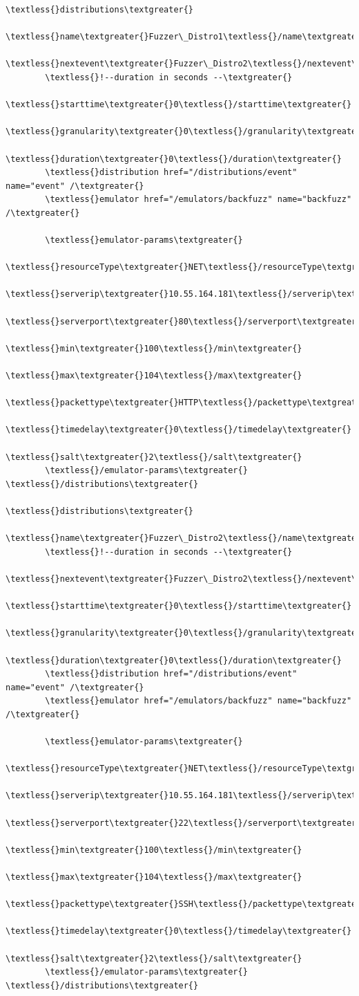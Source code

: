 \documentclass[letterpaper,10pt,english]{sphinxhowto}
\begin{document}
\begin{Verbatim}[commandchars=\\\{\}]
\textless{}distributions\textgreater{}
        \textless{}name\textgreater{}Fuzzer\_Distro1\textless{}/name\textgreater{}
        \textless{}nextevent\textgreater{}Fuzzer\_Distro2\textless{}/nextevent\textgreater{}
        \textless{}!--duration in seconds --\textgreater{}
        \textless{}starttime\textgreater{}0\textless{}/starttime\textgreater{}
        \textless{}granularity\textgreater{}0\textless{}/granularity\textgreater{}
        \textless{}duration\textgreater{}0\textless{}/duration\textgreater{}
        \textless{}distribution href="/distributions/event" name="event" /\textgreater{}
        \textless{}emulator href="/emulators/backfuzz" name="backfuzz" /\textgreater{}

        \textless{}emulator-params\textgreater{}
                \textless{}resourceType\textgreater{}NET\textless{}/resourceType\textgreater{}
                \textless{}serverip\textgreater{}10.55.164.181\textless{}/serverip\textgreater{}
                \textless{}serverport\textgreater{}80\textless{}/serverport\textgreater{}
                \textless{}min\textgreater{}100\textless{}/min\textgreater{}
                \textless{}max\textgreater{}104\textless{}/max\textgreater{}
                \textless{}packettype\textgreater{}HTTP\textless{}/packettype\textgreater{}
                \textless{}timedelay\textgreater{}0\textless{}/timedelay\textgreater{}
                \textless{}salt\textgreater{}2\textless{}/salt\textgreater{}
        \textless{}/emulator-params\textgreater{}
\textless{}/distributions\textgreater{}

\textless{}distributions\textgreater{}
        \textless{}name\textgreater{}Fuzzer\_Distro2\textless{}/name\textgreater{}
        \textless{}!--duration in seconds --\textgreater{}
        \textless{}nextevent\textgreater{}Fuzzer\_Distro2\textless{}/nextevent\textgreater{}
        \textless{}starttime\textgreater{}0\textless{}/starttime\textgreater{}
        \textless{}granularity\textgreater{}0\textless{}/granularity\textgreater{}
        \textless{}duration\textgreater{}0\textless{}/duration\textgreater{}
        \textless{}distribution href="/distributions/event" name="event" /\textgreater{}
        \textless{}emulator href="/emulators/backfuzz" name="backfuzz" /\textgreater{}

        \textless{}emulator-params\textgreater{}
                \textless{}resourceType\textgreater{}NET\textless{}/resourceType\textgreater{}
                \textless{}serverip\textgreater{}10.55.164.181\textless{}/serverip\textgreater{}
                \textless{}serverport\textgreater{}22\textless{}/serverport\textgreater{}
                \textless{}min\textgreater{}100\textless{}/min\textgreater{}
                \textless{}max\textgreater{}104\textless{}/max\textgreater{}
                \textless{}packettype\textgreater{}SSH\textless{}/packettype\textgreater{}
                \textless{}timedelay\textgreater{}0\textless{}/timedelay\textgreater{}
                \textless{}salt\textgreater{}2\textless{}/salt\textgreater{}
        \textless{}/emulator-params\textgreater{}
\textless{}/distributions\textgreater{}
\end{Verbatim}
\end{document}
